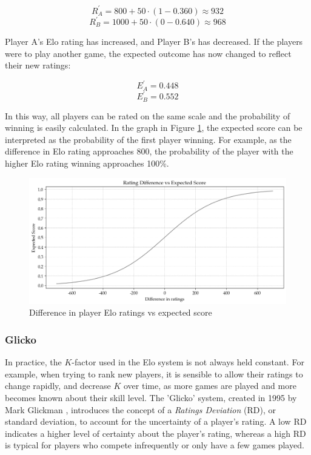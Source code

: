 \[ R_A^{'} = 800 + 50 \cdot (1 - 0.360) \approx 932 \]
\[ R_B^{'} = 1000 + 50 \cdot (0 - 0.640) \approx 968 \]

Player A's Elo rating has increased, and Player B's has decreased. If the players were to play another game, the expected outcome has now changed to reflect their new ratings:

\[ E_A^{'} = 0.448 \]
\[ E_B^{'} = 0.552 \]

In this way, all players can be rated on the same scale and the probability of winning is easily calculated. In the graph in Figure \ref{fig:elo}, the expected score can be interpreted as the probability of the first player winning. For example, as the difference in Elo rating approaches 800, the probability of the player with the higher Elo rating winning approaches 100\%.

\begin{figure}[h]
	\centering
	\includegraphics[width=\textwidth]{Figures/elo.png}
	\caption{Difference in player Elo ratings vs expected score}
	\label{fig:elo}
\end{figure}

\subsubsection{Glicko}

In practice, the $K$-factor used in the Elo system is not always held constant. For example, when trying to rank new players, it is sensible to allow their ratings to change rapidly, and decrease $K$ over time, as more games are played and more becomes known about their skill level. The 'Glicko' system, created in 1995 by Mark Glickman \cite{glicko}, introduces the concept of a \textit{Ratings Deviation} (RD), or standard deviation, to account for the uncertainty of a player's rating. A low RD indicates a higher level of certainty about the player's rating, whereas a high RD is typical for players who compete infrequently or only have a few games played.

